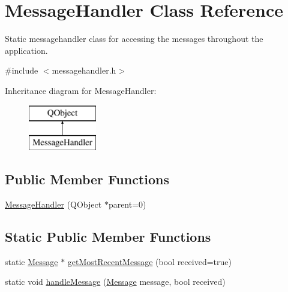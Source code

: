 \hypertarget{class_message_handler}{}\section{Message\+Handler Class Reference}
\label{class_message_handler}


Static messagehandler class for accessing the messages throughout the application.  




{\ttfamily \#include $<$messagehandler.\+h$>$}

Inheritance diagram for Message\+Handler\+:\begin{figure}[H]
\begin{center}
\leavevmode
\includegraphics[height=2.000000cm]{class_message_handler}
\end{center}
\end{figure}
\subsection*{Public Member Functions}
\begin{DoxyCompactItemize}
\item 
\hyperlink{class_message_handler_a9dfaad39ced765947bf2dd27188de452}{Message\+Handler} (Q\+Object $\ast$parent=0)
\end{DoxyCompactItemize}
\subsection*{Static Public Member Functions}
\begin{DoxyCompactItemize}
\item 
static \hyperlink{struct_message}{Message} $\ast$ \hyperlink{class_message_handler_a42b14784fcc1502b639c656f9e2b2622}{get\+Most\+Recent\+Message} (bool received=true)
\item 
static void \hyperlink{class_message_handler_aa9e5166886e7e73e51f99ddf585249b1}{handle\+Message} (\hyperlink{struct_message}{Message} message, bool received)
\end{DoxyCompactItemize}
